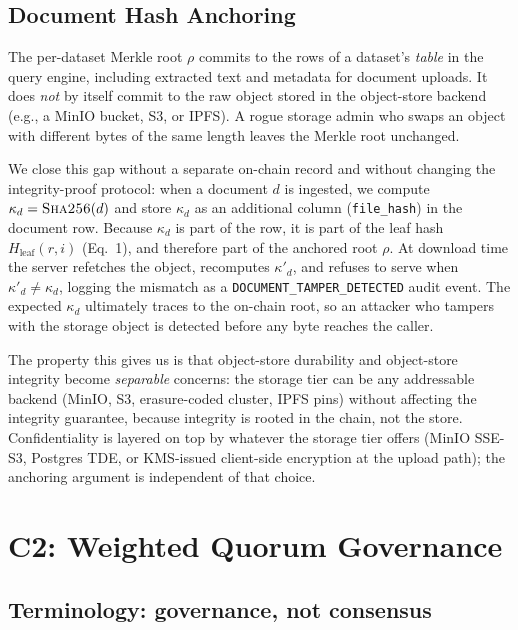 \documentclass[10pt,twocolumn]{article}
\begin{document}
\subsection{Document Hash Anchoring}
\label{sec:dochash}

The per-dataset Merkle root $\rho$ commits to the rows of a
dataset's \emph{table} in the query engine, including extracted
text and metadata for document uploads. It does \emph{not} by
itself commit to the raw object stored in the object-store backend
(e.g., a MinIO bucket, S3, or IPFS). A rogue storage admin who
swaps an object with different bytes of the same length leaves the
Merkle root unchanged.

We close this gap without a separate on-chain record and without
changing the integrity-proof protocol: when a document $d$ is
ingested, we compute
$\kappa_d = \textsc{Sha256}(d)$
and store $\kappa_d$ as an additional column
(\texttt{file\_hash}) in the document row. Because $\kappa_d$
is part of the row, it is part of the leaf hash
$H_{\text{leaf}}(r, i)$ (Eq.~1), and therefore part of the
anchored root $\rho$. At download time the server refetches the
object, recomputes $\kappa'_d$, and refuses to serve when
$\kappa'_d \neq \kappa_d$, logging the mismatch as a
\texttt{DOCUMENT\_TAMPER\_DETECTED} audit event. The expected
$\kappa_d$ ultimately traces to the on-chain root, so an attacker
who tampers with the storage object is detected before any byte
reaches the caller.

The property this gives us is that object-store durability and
object-store integrity become \emph{separable} concerns: the
storage tier can be any addressable backend (MinIO, S3,
erasure-coded cluster, IPFS pins) without affecting the integrity
guarantee, because integrity is rooted in the chain, not the
store. Confidentiality is layered on top by whatever the storage
tier offers (MinIO SSE-S3, Postgres TDE, or KMS-issued client-side
encryption at the upload path); the anchoring argument is
independent of that choice.


\section{C2: Weighted Quorum Governance}
\label{sec:wqg}

\subsection{Terminology: governance, not consensus}
\end{document}
